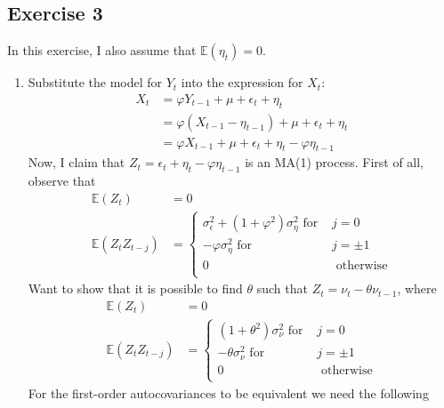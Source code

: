 \documentclass[]{article}
\begin{document}
\subsection*{Exercise 3}
In this exercise, I also assume that $\mathbb{E}(\eta_t) = 0$.
\begin{enumerate}[label=\alph*)]
	\item Substitute the model for $Y_t$ into the expression for $X_t$:
	\begin{equation}
		\begin{split}
		X_t& = \varphi Y_{t-1} + \mu + \epsilon_t + \eta_t \\ \nonumber
		& = \varphi (X_{t-1}-\eta_{t-1}) + \mu + \epsilon_t + \eta_t \\
		& = \varphi X_{t-1} + \mu + \epsilon_t + \eta_t - \varphi\eta_{t-1} 
		\end{split}
	\end{equation}
	Now, I claim that $Z_t = \epsilon_t + \eta_t - \varphi\eta_{t-1}$ is an MA(1) process. First of all, observe that
	\begin{equation}
		\begin{split}
		\mathbb{E}(Z_t)& = 0 \\ \nonumber
		\mathbb{E}(Z_tZ_{t-j})& = \begin{cases}
		\sigma_\epsilon^2 + (1+\varphi^2)\sigma_\eta^2\text{ for }&j = 0\\
		-\varphi\sigma_\eta^2 \text{ for }&j = \pm 1\\
		0 &\text{ otherwise}\\
		\end{cases}
		\end{split}
	\end{equation}
	Want to show that it is possible to find $\theta$ such that $Z_t = \nu_t - \theta\nu_{t-1}$, where
		\begin{equation}
	\begin{split}
	\mathbb{E}(Z_t)& = 0 \\ \nonumber
	\mathbb{E}(Z_tZ_{t-j})& = \begin{cases}
	(1+\theta^2)\sigma_\nu^2\text{ for }&j = 0\\
	-\theta\sigma_\nu^2 \text{ for }&j = \pm 1\\
	0 &\text{ otherwise}\\
	\end{cases}
	\end{split}
	\end{equation}
	For the first-order autocovariances to be equivalent we need the following
	\begin{equation}

\end{equation}
\end{enumerate}
\end{document}
